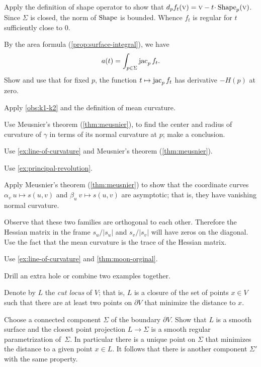 Apply the definition of shape operator to show that $d_pf_t(\vec v)=\vec v-t\cdot\Shape_p(\vec v)$.
Since $\Sigma$ is closed, the norm of $\mathop{\rm Shape}\nolimits$ is bounded.
Whence $f_t$ is regular for $t$ sufficiently close to $ 0$.

 By the area formula (\ref{prop:surface-integral}), we have
\[a(t)=\int_{p\in \Sigma}\mathop{\rm jac}\nolimits_pf_t.\]
Show and use that for fixed $p$, the function $t\mapsto \mathop{\rm jac}\nolimits_pf_t$ has derivative $-H(p)$ at zero.

Apply \ref{obs:k1-k2} and the definition of mean curvature.

 Use Meusnier's theorem (\ref{thm:meusnier}), to find the center and radius of curvature of $\gamma$ in terms of its normal curvature at $p$;
make a conclusion.

Use \ref{ex:line-of-curvature} and Meusnier's theorem (\ref{thm:meusnier}).

 Use \ref{ex:principal-revolution}.

 Apply Meusnier's theorem (\ref{thm:meusnier}) to show that the coordinate curves $\alpha_v\:u\mapsto s(u,v)$ and $\beta_u\:v\mapsto s(u,v)$ are asymptotic; that is, they have vanishing normal curvature.

Observe that these two families are orthogonal to each other.
Therefore the Hessian matrix in the frame $s_u/|s_u|$ and $s_v/|s_v|$ will have zeros on the diagonal.
Use the fact that the mean curvature is the trace of the Hessian matrix.

 Use \ref{ex:line-of-curvature} and \ref{thm:moon-orginal}.

 Drill an extra hole or combine two examples together.

Denote by $L$ the \emph{cut locus} of $V$;
that is, $L$ is a closure of the set of points $x\in V$ such that there are at least two points on $\partial V$ that minimize the distance to $x$.

Choose a connected component $\Sigma$ of the boundary $\partial V$.
Show that $L$ is a smooth surface and the closest point projection $L\to \Sigma$ is a smooth regular parametrization of~$\Sigma$.
In particular there is a unique point on $\Sigma$ that minimizes the distance to a given point $x\in L$.
It follows that there is another component $\Sigma'$ with the same property.

